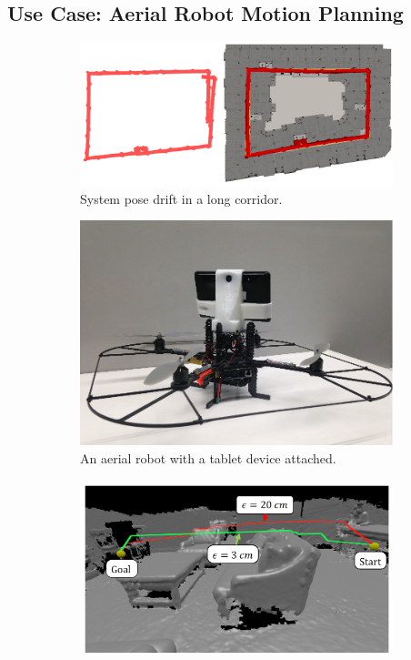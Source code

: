 \documentclass[conference]{IEEEtran}
\begin{document}
 \subsection{Use Case: Aerial Robot Motion Planning}
 \label{section:robot}
  \begin{figure}
  \centering
   	 \begin{subfigure}{0.55\columnwidth}\centering
 	 \includegraphics[width=1\textwidth]{img/corridor_composite.png}
 	 \caption{System pose drift in a long corridor.}
 	 \label{fig:drift}
 	 \end{subfigure}
  \begin{subfigure}{0.43\columnwidth}\centering
	 \includegraphics[width=1.0\textwidth]{img/aerial.jpg}
	 \caption{An aerial robot with a tablet device attached.}
	 \label{fig:robot}
  \end{subfigure}
	\begin{subfigure}{0.8\columnwidth}\centering
	 \includegraphics[width=1\textwidth]{img/path_plan.pdf}

\end{subfigure}
\end{figure}
\end{document}
